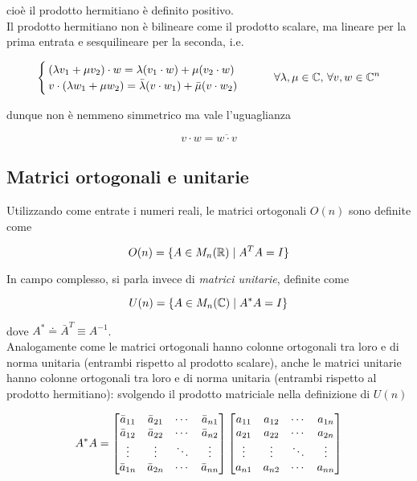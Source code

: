 cioè il prodotto hermitiano è definito positivo.\\
Il prodotto hermitiano non è bilineare come il prodotto scalare, ma lineare per la prima entrata e sesquilineare per la seconda, i.e.

\begin{equation}
	\begin{cases}
		(\lambda v_{1} + \mu v_{2}) \cdot w = \lambda (v_{1} \cdot w) + \mu (v_{2} \cdot w) \\
		v \cdot (\lambda w_{1} + \mu w_{2}) = \bar{\lambda} (v \cdot w_{1}) + \bar{\mu} (v \cdot w_{2})
	\end{cases} %
	\qquad \forall \lambda,\mu \in \C, \, \forall v,w \in \C^{n}
\end{equation}

dunque non è nemmeno simmetrico ma vale l'uguaglianza

\begin{equation}
	v \cdot w = \overline{w \cdot v}
\end{equation}

\subsection{Matrici ortogonali e unitarie}

Utilizzando come entrate i numeri reali, le matrici ortogonali $ O(n) $ sono definite come

\begin{equation}
	O(n) = \{ A \in M_{n}(\mathbb{R}) \mid A^{T} A = I \}
\end{equation}

In campo complesso, si parla invece di \textit{matrici unitarie}, definite come

\begin{equation}
	U(n) = \{ A \in M_{n}(\mathbb{C}) \mid A^{*} A = I \}
\end{equation}

dove $ A^{*} \doteq \bar{A}^{T} \equiv A ^{-1} $.\\
Analogamente come le matrici ortogonali hanno colonne ortogonali tra loro e di norma unitaria (entrambi rispetto al prodotto scalare), anche le matrici unitarie hanno colonne ortogonali tra loro e di norma unitaria (entrambi rispetto al prodotto hermitiano): svolgendo il prodotto matriciale nella definizione di $ U(n) $

\begin{equation}
	A^{*} A = %
	\bmqty{ %
			\bar{a}_{11} & \bar{a}_{21} & \cdots & \bar{a}_{n1} \\ %
			\bar{a}_{12} & \bar{a}_{22} & \cdots & \bar{a}_{n2} \\ %
			\vdots & \vdots & \ddots & \vdots \\ %
			\bar{a}_{1n} & \bar{a}_{2n} & \cdots & \bar{a}_{nn}
			}
	\bmqty{ %
			a_{11} & a_{12} & \cdots & a_{1n} \\ %
			a_{21} & a_{22} & \cdots& a_{2n} \\ %
			\vdots & \vdots & \ddots & \vdots \\ %
			a_{n1} & a_{n2} & \cdots & a_{nn}
			}
\end{equation}

